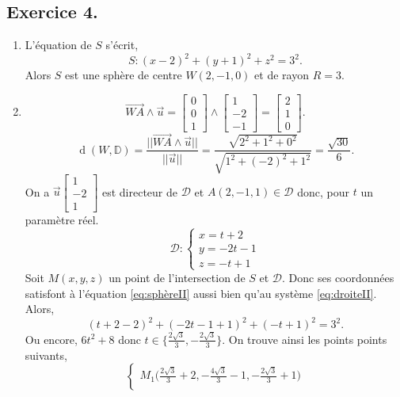 \documentclass{article}
\DeclareMathOperator{\distan}{d}
\begin{document}
\subsection*{Exercice 4.}
\begin{enumerate}
	\item	L'équation de $S$ s'écrit,
		\begin{equation}
			S:(x-2)^2+(y+1)^2+z^2=3^2.\label{eq:sphèreII}
	\end{equation} 
	Alors  $S$ est une sphère de centre $W(2,-1,0)$ et de rayon $R=3$.
\item  \[
		\overrightarrow{WA}\wedge\vec{u}=\begin{bmatrix}0\\0\\1\end{bmatrix}\wedge\begin{bmatrix}1\\-2\\-1\end{bmatrix}=\begin{bmatrix}2\\1\\0\end{bmatrix}
.\] 
\[
	\distan(W,\mathbb{D})=\frac{\Big|\Big|\overrightarrow{WA}\wedge\vec{u}\Big|\Big|}{||\vec{u}||}=\frac{\sqrt{2^2+1^2+0^2}}{\sqrt{1^2+(-2)^2+1^2}}=\frac{\sqrt{30}}{6}
.\] 
On a $\vec{u}\begin{bmatrix}1\\-2\\1\end{bmatrix}$ est directeur de $\mathcal{D}$ et $A(2,-1,1)\in\mathcal{D}$ donc, pour $t$ un paramètre réel.
\begin{equation}
	\mathcal{D}:\begin{cases}
		x=t+2\\
		y=-2t-1\\
		z=-t+1
	\end{cases}\label{eq:droiteII}
	\end{equation}
	Soit $M(x,y,z)$ un point de l'intersection de $S$ et $\mathcal{D}$. Donc ses coordonnées satisfont à l'équation \eqref{eq:sphèreII} aussi bien qu'au système \eqref{eq:droiteII}. Alors,
	\[
		(t+2-2)^2+(-2t-1+1)^2+(-t+1)^2=3^2
	.\] 
	Ou encore, $6t^2+8$ donc $t\in\Big\{\frac{2\sqrt{3}}{3},-\frac{2\sqrt{3}}{3}\Big\}$. On trouve ainsi les points points suivants,
	 \[
		 \begin{cases}
			 M_1\Big(\frac{2\sqrt{3}}{3}+2,-\frac{4\sqrt{3}}{3}-1,-\frac{2\sqrt{3}}{3}+1\Big)\\

\end{cases}\]
\end{enumerate}
\end{document}
